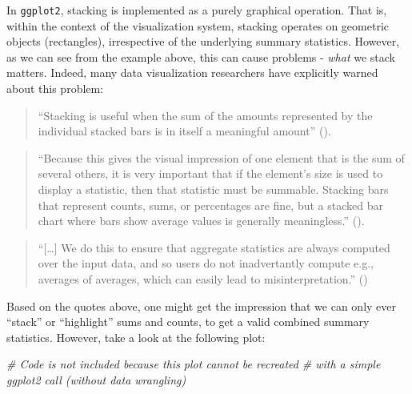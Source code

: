 \documentclass[
]{book}
\newenvironment{Shaded}{\begin{snugshade}}{\end{snugshade}}
\newcommand{\CommentTok}[1]{\textcolor[rgb]{0.56,0.35,0.01}{\textit{#1}}}
\theoremstyle{definition}
\theoremstyle{definition}
\theoremstyle{definition}
\theoremstyle{definition}
\theoremstyle{remark}
\begin{document}
In \texttt{ggplot2}, stacking is implemented as a purely graphical operation. That is, within the context of the visualization system, stacking operates on geometric objects (rectangles), irrespective of the underlying summary statistics. However, as we can see from the example above, this can cause problems - \emph{what} we stack matters. Indeed, many data visualization researchers have explicitly warned about this problem:

\begin{quote}
``Stacking is useful when the sum of the amounts represented by the individual stacked bars is in itself a meaningful amount'' ().
\end{quote}

\begin{quote}
``Because this gives the visual impression of one element that is the sum of several others, it is very important that if the element's size is used to display a statistic, then that statistic must be summable. Stacking bars that represent counts, sums, or percentages are fine, but a stacked bar chart where bars show average values is generally meaningless.'' ().
\end{quote}

\begin{quote}
``{[}\ldots{]} We do this to ensure that aggregate statistics are always computed over the input data, and so users do not inadvertantly compute e.g., averages of averages, which can easily lead to misinterpretation.'' ()
\end{quote}

Based on the quotes above, one might get the impression that we can only ever ``stack'' or ``highlight'' sums and counts, to get a valid combined summary statistics. However, take a look at the following plot:

\begin{Shaded}
\begin{Highlighting}[]
\CommentTok{\# Code is not included because this plot cannot be recreated }
\CommentTok{\# with a simple ggplot2 call (without data wrangling)}
\end{Highlighting}
\end{Shaded}
\end{document}
